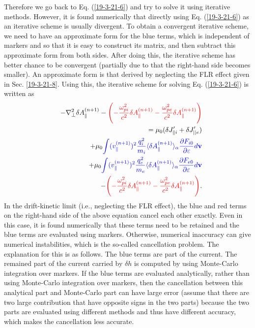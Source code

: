 \documentclass{llncs}
\newcommand{\tmcolor}[2]{{\color{#1}{#2}}}
\begin{document}
Therefore we go back to Eq. (\ref{19-3-21-6}) and try to solve it using
iterative methods. However, it is found numerically that directly using Eq.
(\ref{19-3-21-6}) as an iterative scheme is usually divergent. To obtain a
convergent iterative scheme, we need to have an approximate form for the blue
terms, which is independent of markers and so that it is easy to construct its
matrix, and then subtract this approximate form from both sides. After doing
this, the iterative scheme has better chance to be convergent (partially due
to that the right-hand side becomes smaller). An approximate form is that
derived by neglecting the FLR effect given in Sec. \ref{19-3-21-8}. Using
this, the iterative scheme for solving Eq. (\ref{19-3-21-6}) is written as
\begin{eqnarray}
  &  & - \nabla^2_{\perp} \delta A_{\parallel}^{(n + 1)} -
  \tmcolor{red}{\left( - \frac{\omega_{p i}^2}{c^2} \delta A_{\parallel}^{(n +
  1)} - \frac{\omega_{p e}^2}{c^2} \delta A_{\parallel}^{(n + 1)} \right)}
  \nonumber\\
  &  & = \mu_0  (\delta J_{\parallel i}' + \delta J'_{||e}) \nonumber\\
  &  & + \mu_0 \tmcolor{blue}{\int (v_{\parallel}^{(n + 1)})^2
  \frac{q^2_i}{m_i} \langle \delta A_{\parallel}^{(n + 1)} \rangle_{\alpha}
  \frac{\partial F_{i 0}}{\partial \varepsilon} d\mathbf{v}} \nonumber\\
  &  & + \mu_0 \tmcolor{blue}{\int (v_{\parallel}^{(n + 1)})^2
  \frac{q^2_e}{m_e} \langle \delta A_{\parallel}^{(n + 1)} \rangle_{\alpha}
  \frac{\partial F_{e 0}}{\partial \varepsilon} d\mathbf{v}} \nonumber\\
  &  & - \tmcolor{red}{\left( - \frac{\omega_{p i}^2}{c^2} \delta
  A_{\parallel}^{(n + 1)} - \frac{\omega_{p e}^2}{c^2} \delta
  A_{\parallel}^{(n + 1)} \right)} .  \label{19-3-21-p1}
\end{eqnarray}
In the drift-kinetic limit (i.e., neglecting the FLR effect), the blue and red
terms on the right-hand side of the above equation cancel each other exactly.
Even in this case, it is found numerically that these terms need to be
retained and the blue terms are evaluated using markers. Otherwise, numerical
inaccuracy can give numerical instabilities, which is the so-called
cancellation problem. The explanation for this is as follows. The blue terms
are part of the current. The remained part of the current carried by $\delta
h$ is computed by using Monte-Carlo integration over markers. If the blue
terms are evaluated analytically, rather than using Monte-Carlo integration
over markers, then the cancellation between this analytical part and
Monte-Carlo part can have large error (assume that there are two large
contribution that have opposite signs in the two parts) because the two parts
are evaluated using different methods and thus have different accuracy, which
makes the cancellation less accurate.
\end{document}
